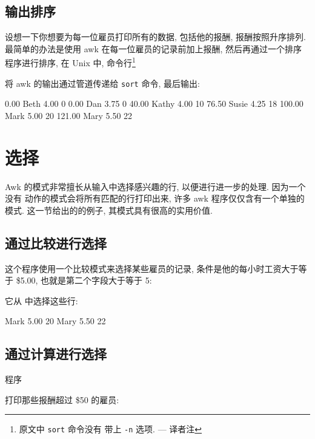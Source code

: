 \subsection{输出排序}
\label{subsec:sorting_the_output}

设想一下你想要为每一位雇员打印所有的数据, 包括他的报酬, 报酬按照升序排列.
最简单的办法是使用 awk 在每一位雇员的记录前加上报酬, 然后再通过一个排序
程序进行排序, 在 Unix 中, 命令行\footnote{原文中 \texttt{sort} 命令没有
带上 \texttt{-n} 选项. --- 译者注}
将 awk 的输出通过管道传递给 \texttt{sort} 命令, 最后输出:
\begin{file}
      0.00 Beth    4.00    0
      0.00 Dan     3.75    0
     40.00 Kathy   4.00    10
     76.50 Susie   4.25    18
    100.00 Mark    5.00    20
    121.00 Mary    5.50    22
\end{file}

\section{选择}
\label{sec:selection}

Awk 的模式非常擅长从输入中选择感兴趣的行, 以便进行进一步的处理. 因为一个没有
动作的模式会将所有匹配的行打印出来, 许多 awk 程序仅仅含有一个单独的模式.
这一节给出的的例子, 其模式具有很高的实用价值.

\subsection{通过比较进行选择}
\label{subsec:selection_by_comparison}

这个程序使用一个比较模式来选择某些雇员的记录, 条件是他的每小时工资大于等于
\$5.00, 也就是第二个字段大于等于 5:
它从  中选择这些行:
\begin{awkcode}
    Mark    5.00    20
    Mary    5.50    22
\end{awkcode}

\subsection{通过计算进行选择}
\label{subsec:selection_by_computation}

程序
打印那些报酬超过 \$50 的雇员:

